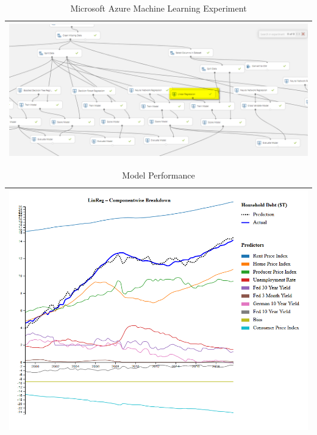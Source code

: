 \documentclass[sigconf,nonacm,11pt]{acmart}
\begin{document}
\begin{appendix}
\begin{table}[ht]
\caption{Microsoft Azure Machine Learning Experiment}
\centering
\begin{tabular}{p{1.0\linewidth}}
\hline
\includegraphics[scale = 0.46]{teamfed_azure_ml.png}\\
\hline
\end{tabular}
\end{table}


\begin{table}[ht]
\caption{Model Performance}
\centering
\begin{tabular}{p{1.0\linewidth}}
\hline
\includegraphics[scale = 0.46]{linreg.png}\\
\hline
\end{tabular}
\end{table}

\end{appendix}

\end{document}
